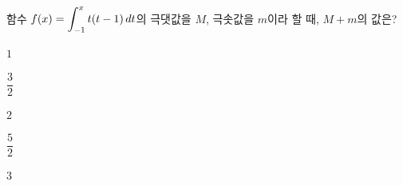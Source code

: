 함수 $f(x)=\displaystyle\int_{-1}^{x}t(t-1)\mkern3mu dt$의 극댓값을 $M$, 극솟값을 $m$이라 할 때, $M+m$의 값은?
\begin{choices32}{\rule[-3ex]{0pt}{8ex}$1$}{\rule[-3ex]{0pt}{8ex}$\dfrac{3}{2}$}{\rule[-3ex]{0pt}{8ex}$2$}{\rule[-3ex]{0pt}{8ex}$\dfrac{5}{2}$}{\rule[-3ex]{0pt}{8ex}$3$}\end{choices32}
